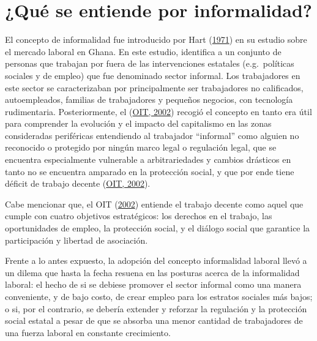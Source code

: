\documentclass[
  letterpaper,
  12pt,
  oneside,
  spanish,
  doublespacing,
  headsepline,
  parskip]{MastersDoctoralThesis}
\begin{document}
\hypertarget{quuxe9-se-entiende-por-informalidad}{%
\section{¿Qué se entiende por
informalidad?}\label{quuxe9-se-entiende-por-informalidad}}

El concepto de informalidad fue introducido por Hart
(\protect\hyperlink{ref-hart1971}{1971}) en su estudio sobre el mercado
laboral en Ghana. En este estudio, identifica a un conjunto de personas
que trabajan por fuera de las intervenciones estatales (e.g.~políticas
sociales y de empleo) que fue denominado sector informal. Los
trabajadores en este sector se caracterizaban por principalmente ser
trabajadores no calificados, autoempleados, familias de trabajadores y
pequeños negocios, con tecnología rudimentaria. Posteriormente, el
(\protect\hyperlink{ref-oit2002}{OIT, 2002}) recogió el concepto en
tanto era útil para comprender la evolución y el impacto del capitalismo
en las zonas consideradas periféricas entendiendo al trabajador
``informal'' como alguien no reconocido o protegido por ningún marco
legal o regulación legal, que se encuentra especialmente vulnerable a
arbitrariedades y cambios drásticos en tanto no se encuentra amparado en
la protección social, y que por ende tiene déficit de trabajo decente
(\protect\hyperlink{ref-oit2002}{OIT, 2002}).

Cabe mencionar que, el OIT (\protect\hyperlink{ref-oit2002}{2002})
entiende el trabajo decente como aquel que cumple con cuatro objetivos
estratégicos: los derechos en el trabajo, las oportunidades de empleo,
la protección social, y el diálogo social que garantice la participación
y libertad de asociación.

Frente a lo antes expuesto, la adopción del concepto informalidad
laboral llevó a un dilema que hasta la fecha resuena en las posturas
acerca de la informalidad laboral: el hecho de si se debiese promover el
sector informal como una manera conveniente, y de bajo costo, de crear
empleo para los estratos sociales más bajos; o si, por el contrario, se
debería extender y reforzar la regulación y la protección social estatal
a pesar de que se absorba una menor cantidad de trabajadores de una
fuerza laboral en constante crecimiento.
\end{document}
